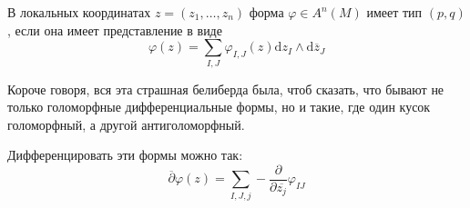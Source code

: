     В локальных координатах $z = (z_{1}, \ldots, z_{n})$ форма $\varphi \in A^{n}(M)$ имеет тип  $(p, q)$, если она имеет
    представление в виде
    \[ \varphi(z) = \sum_{I, J} \varphi_{I, J}(z) \mathrm{d}z_{I} \wedge \mathrm{d}\overline{z}_{J} \]

    \begin{remark}
       Короче говоря, вся эта страшная белиберда была, чтоб сказать, что бывают не только голоморфные дифференциальные формы, но и такие, где
        один кусок голоморфный, а другой антиголоморфный.
    \end{remark}

   Дифференцировать эти формы можно так:
    \[ \overline{\partial}\varphi(z) = \sum_{I, J, j} - \frac{\partial}{\partial \overline{z_{j}}} \varphi_{I J}\]

    







